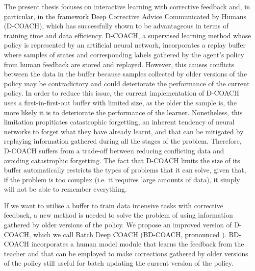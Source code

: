 The present thesis focuses on interactive learning with corrective feedback and, in particular, in the framework Deep Corrective Advice Communicated by Humans (D-COACH), which has successfully shown to be advantageous in terms of training time and data efficiency. D-COACH, a supervised learning method whose policy is represented by an artificial neural network, incorporates a replay buffer where samples of states and corresponding labels gathered by the agent's policy from human feedback are stored and replayed. However, this causes conflicts between the data in the buffer because samples collected by older versions of the policy may be contradictory and could deteriorate the performance of the current policy. In order to reduce this issue, the current implementation of D-COACH uses a first-in-first-out buffer with limited size, as the older the sample is, the more likely it is to deteriorate the performance of the learner. Nonetheless, this limitation propitiates catastrophic forgetting, an inherent tendency of neural networks to forget what they have already learnt, and that can be mitigated by replaying information gathered during all the stages of the problem. Therefore, D-COACH suffers from a trade-off between reducing conflicting data and avoiding catastrophic forgetting. The fact that D-COACH limits the size of its buffer automatically restricts the types of problems that it can solve, given that, if the problem is too complex (i.e. it requires large amounts of data), it simply will not be able to remember everything.





\vspace{3mm} %

If we want to utilise a buffer to train data intensive tasks with corrective feedback, a new method is needed to solve the problem of using information gathered by older versions of the policy. We propose an improved version of D-COACH, which we call Batch Deep COACH (BD-COACH, pronounced ). BD-COACH incorporates a human model module that learns the feedback from the teacher and that can be employed to make corrections gathered by older versions of the policy still useful for batch updating the current version of the policy.


